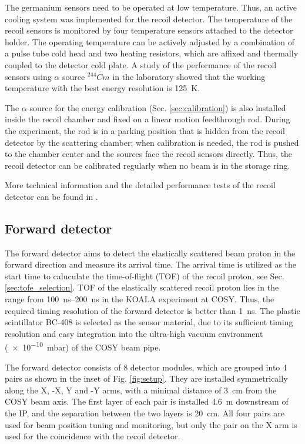 \documentclass[number,5p]{elsarticle}
\begin{document}
The germanium sensors need to be operated at low temperature.
Thus, an active cooling system was implemented for the recoil detector.
The temperature of the recoil sensors is monitored by four temperature sensors attached to the detector holder.
The operating temperature can be actively adjusted by a combination of a pulse
tube cold head \cite{pt30} and two heating resistors, which are affixed and thermally coupled to the detector cold plate.
A study of the performance of the recoil sensors using $\alpha$ source
$^{244}Cm$ in the laboratory \cite{recoil_article} showed that the working temperature with the best energy resolution is
\SI{125}{\kelvin}.

The $\alpha$ source for the energy calibration (Sec. \ref{sec:calibration}) is also installed inside the recoil chamber and fixed on a linear motion feedthrough rod.
During the experiment, the rod is in a parking position that is hidden from the
recoil detector by the scattering chamber;
when calibration is needed, the rod is pushed to the chamber center and the sources face the recoil sensors directly.
Thus, the recoil detector can be calibrated regularly when no beam is in the storage ring.

More technical information and the detailed performance tests of the recoil detector can be found in \cite{recoil_article}.

\subsection{Forward detector}
\label{sec:fwd}

The forward detector aims to detect the elastically scattered beam proton in the
forward direction and measure its arrival time.
The arrival time is utilized as the start time to caluculate the time-of-flight (TOF)
of the recoil proton, see Sec. \ref{sec:tofe_selection}.
TOF of the elastically scattered recoil proton lies in the range from
\SIrange{100}{200}{\ns} in the KOALA experiment at COSY.
Thus, the required timing resolution of the forward detector is better than \SI{1}{\ns}.
The plastic scintillator BC-408 \cite{bc408} is selected as the sensor
material, due to its sufficient timing resolution and
easy integration into the ultra-high vacuum environment (\SI{e-10}{\milli\bar}) of the COSY beam pipe.

The forward detector consists of 8 detector modules, which are
grouped into 4 pairs as shown in the inset of Fig. \ref{fig:setup}.
They are installed symmetrically along the X, -X, Y and -Y arms, with a
minimal distance of \SI{3}{\cm} from the COSY beam axis.
The first layer of each pair is installed \SI{4.6}{\meter} downstream of the IP, and the separation between the two layers is \SI{20}{\cm}.
All four pairs are used for beam position tuning and monitoring, but only the
pair on the X arm is used for the coincidence with the recoil detector.
\end{document}

